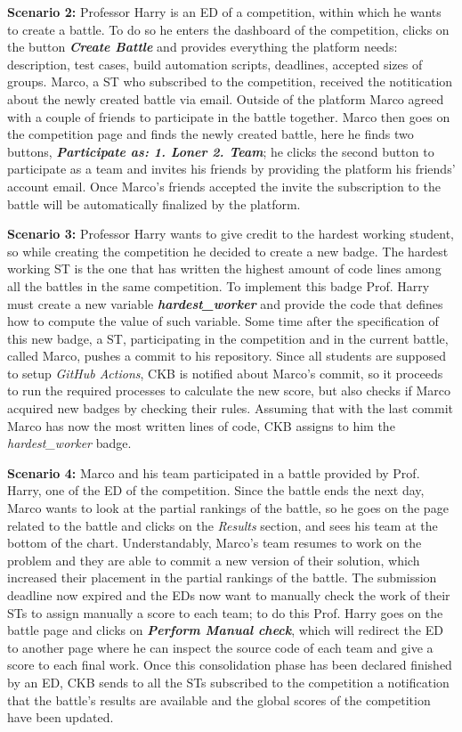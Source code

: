 \textbf{Scenario 2:} Professor Harry is an ED of a competition, within which he wants to create a battle. To do so he enters the dashboard of the competition, clicks on the button \textbf{\textit{Create Battle}} and provides everything the platform needs: description, test cases, build automation scripts, deadlines, accepted sizes of groups. Marco, a ST who subscribed to the competition, received the notitication about the newly created battle via email. Outside of the platform Marco agreed with a couple of friends to participate in the battle together. Marco then goes on the competition page and finds the newly created battle, here he finds two buttons, \textbf{\textit{Participate as: 1. Loner 2. Team}}; he clicks the second button to participate as a team and invites his friends by providing the platform his friends' account email. Once Marco's friends accepted the invite the subscription to the battle will be automatically finalized by the platform.


\textbf{Scenario 3:} Professor Harry wants to give credit to the hardest working student, so while creating the competition he decided to create a new badge. The hardest working ST is the one that has written the highest amount of code lines among all the battles in the same competition. To implement this badge Prof. Harry must create a new variable \textbf{\textit{hardest\_worker}} and provide the code that defines how to compute the value of such variable. Some time after the specification of this new badge, a ST, participating in the competition and in the current battle, called Marco, pushes a commit to his repository. Since all students are supposed to setup \textit{GitHub Actions}, CKB is notified about Marco's commit, so it proceeds to run the required processes to calculate the new score, but also checks if Marco acquired new badges by checking their rules. Assuming that with the last commit Marco has now the most written lines of code, CKB assigns to him the \textit{hardest\_worker} badge.


\textbf{Scenario 4:} Marco and his team participated in a battle provided by Prof. Harry, one of the ED of the competition. Since the battle ends the next day, Marco wants to look at the partial rankings of the battle, so he goes on the page related to the battle and clicks on the \textit{Results} section, and sees his team at the bottom of the chart. Understandably, Marco's team resumes to work on the problem and they are able to commit a new version of their solution, which increased their placement in the partial rankings of the battle. The submission deadline now expired and the EDs now want to manually check the work of their STs to assign manually a score to each team; to do this Prof. Harry goes on the battle page and clicks on \textbf{\textit{Perform Manual check}}, which will redirect the ED to another page where he can inspect the source code of each team and give a score to each final work. Once this consolidation phase has been declared finished by an ED, CKB sends to all the STs subscribed to the competition a notification that the battle's results are available and the global scores of the competition have been updated.


